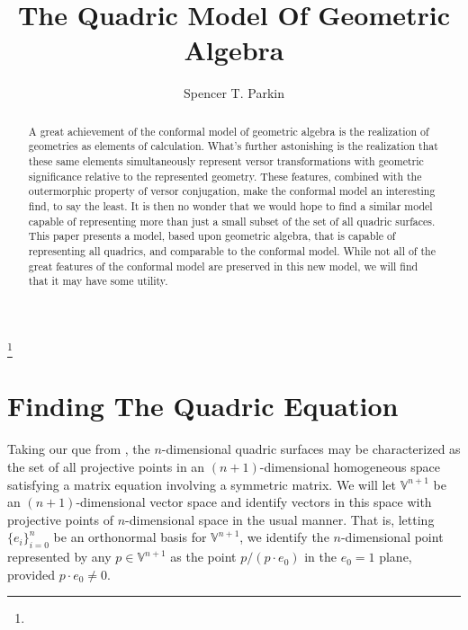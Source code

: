 \documentclass{ecgd-l}
\theoremstyle{definition}
\theoremstyle{remark}
\numberwithin{equation}{section}
\newcommand{\V}{\mathbb{V}}
\begin{document}
\title{The Quadric Model Of Geometric Algebra}


\author{Spencer T. Parkin}
\address{}
\curraddr{}
\thanks{}



\date{}

\dedicatory{}

\begin{abstract}
A great achievement of the conformal model of geometric algebra is the
realization of geometries as elements of calculation.  What's further astonishing
is the realization that these same elements simultaneously represent versor transformations
with geometric significance relative to the represented geometry.
These features, combined with the outermorphic property of versor conjugation,
make the conformal model an interesting find, to say the least.  It is then no wonder
that we would hope to find a similar model capable of representing more than
just a small subset of the set of all quadric surfaces.  This paper presents a model,
based upon geometric algebra, that is capable of representing all quadrics, and
comparable to the conformal model.  While not all of the great features of the conformal
model are preserved in this new model, we will find that it may have some utility.
\end{abstract}

\maketitle


\nocite{DoranHestenes93}
\nocite{WikipediaQuadricEntry}

\section{Finding The Quadric Equation}

Taking our que from \cite{WikipediaQuadricEntry}, the $n$-dimensional quadric surfaces
may be characterized as the set of all projective points in an $(n+1)$-dimensional homogeneous space
satisfying a matrix equation involving a symmetric matrix.  We will let $\V^{n+1}$ be an
$(n+1)$-dimensional vector space and identify vectors in this space with projective
points of $n$-dimensional space in the usual manner.  That is, letting $\{e_i\}_{i=0}^n$
be an orthonormal basis for $\V^{n+1}$, we identify the $n$-dimensional point
represented by any $p\in\V^{n+1}$ as the point $p/(p\cdot e_0)$ in the $e_0=1$ plane,
provided $p\cdot e_0\neq 0$.
\end{document}
